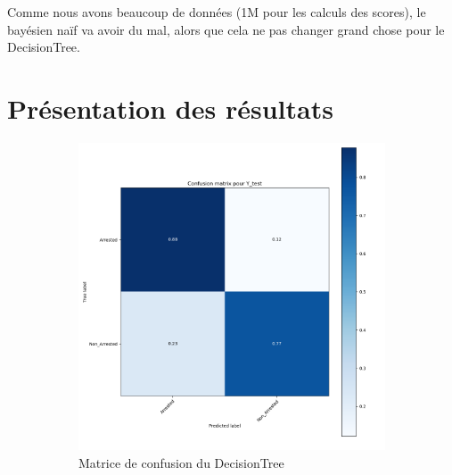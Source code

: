 \documentclass{article}
\begin{document}
    Comme nous avons beaucoup de données (1M pour les calculs des scores),
    le bayésien naïf va avoir du mal, alors que cela ne pas changer grand
    chose pour le DecisionTree.

    \section{Présentation des résultats}

    \begin{figure}[H]
	    \begin{subfigure}{.45\textwidth}
		    \includegraphics[scale=.314]{images/MatriceConfusionDecisionTree.png}
		    \centering
		    \caption{Matrice de confusion du DecisionTree}
	    \end{subfigure}
	    \begin{subfigure}{.45\textwidth}
		    \centering

\end{subfigure}
\end{figure}
\end{document}
